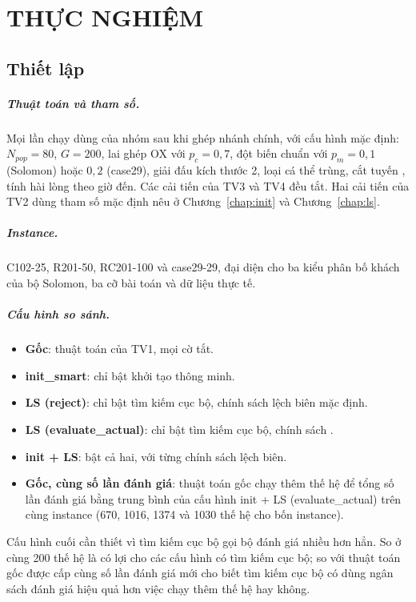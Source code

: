 \chapter{THỰC NGHIỆM}
\label{chap:thucnghiem}

\section{Thiết lập}

\paragraph{Thuật toán và tham số.} Mọi lần chạy dùng  của nhóm sau khi ghép nhánh
chính, với cấu hình mặc định: $N_{pop} = 80$, $G = 200$, lai ghép OX với $p_c = 0{,}7$, đột biến chuẩn
với $p_m = 0{,}1$ (Solomon) hoặc $0{,}2$ (case29), giải đấu kích thước 2, loại cá thể trùng, cắt tuyến
, tính hài lòng theo giờ đến. Các cải tiến của TV3 và TV4 đều tắt. Hai cải tiến của
TV2 dùng tham số mặc định nêu ở Chương~\ref{chap:init} và Chương~\ref{chap:ls}.

\paragraph{Instance.} C102-25, R201-50, RC201-100 và case29-29, đại diện cho ba kiểu phân bố khách của
bộ Solomon, ba cỡ bài toán và dữ liệu thực tế.

\paragraph{Cấu hình so sánh.}
\begin{itemize}
  \item \textbf{Gốc}: thuật toán của TV1, mọi cờ tắt.
  \item \textbf{init\_smart}: chỉ bật khởi tạo thông minh.
  \item \textbf{LS (reject)}: chỉ bật tìm kiếm cục bộ, chính sách lệch biên mặc định.
  \item \textbf{LS (evaluate\_actual)}: chỉ bật tìm kiếm cục bộ, chính sách .
  \item \textbf{init + LS}: bật cả hai, với từng chính sách lệch biên.
  \item \textbf{Gốc, cùng số lần đánh giá}: thuật toán gốc chạy thêm thế hệ để tổng số lần đánh giá bằng
        trung bình của cấu hình init + LS (evaluate\_actual) trên cùng instance (670, 1016, 1374 và 1030
        thế hệ cho bốn instance).
\end{itemize}
Cấu hình cuối cần thiết vì tìm kiếm cục bộ gọi bộ đánh giá nhiều hơn hẳn. So ở cùng 200 thế hệ là có lợi
cho các cấu hình có tìm kiếm cục bộ; so với thuật toán gốc được cấp cùng số lần đánh giá mới cho biết
tìm kiếm cục bộ có dùng ngân sách đánh giá hiệu quả hơn việc chạy thêm thế hệ hay không.

